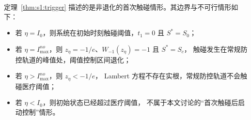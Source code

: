 \documentclass[lang=cn,a4paper,newtx]{elegantpaper}
\numberwithin{equation}{section}
\theoremstyle{plain}
\begin{document}
\begin{remark}
定理~\ref{thm:s1:trigger} 描述的是非退化的首次触碰情形。其边界与不可行情形如下：
\begin{itemize}
\item 若 $\eta=I_0$，则系统在初始时刻触碰阈值，$t_1=0$ 且 $S^*=S_0$；
\item 若 $\eta=I_{\max}^{no}$，则
$z_\eta=-1/e$、$W_{-1}(z_\eta)=-1$ 且 $S^*=S_c$，
触碰发生在常规防控轨道的峰值处，阈值控制区间退化；
\item 若 $\eta>I_{\max}^{no}$，则 $z_\eta<-1/e$，
Lambert 方程不存在实根，常规防控轨道不会触碰医疗阈值；
\item 若 $\eta<I_0$，则初始状态已经超过医疗阈值，
不属于本文讨论的“首次触碰后启动控制”情形。
\end{itemize}
\end{remark}
\end{document}

